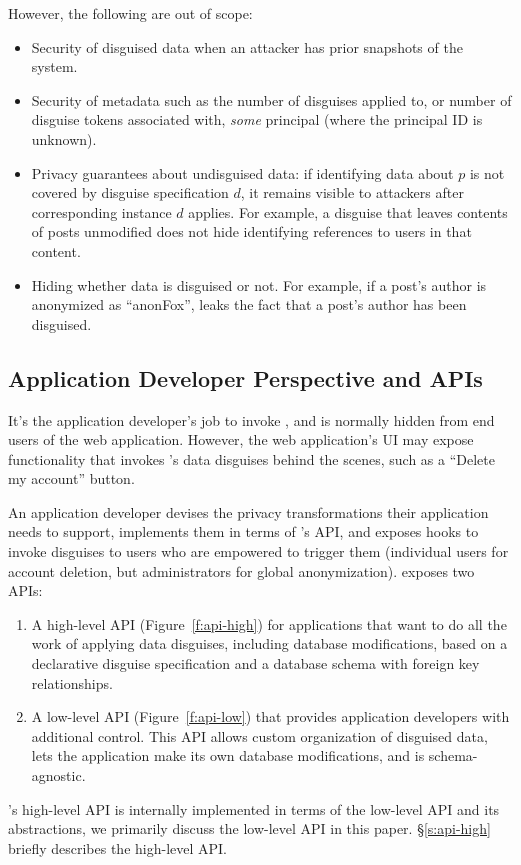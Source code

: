%
However, the following are out of scope:
%
\begin{itemize}[nosep]
    \item Security of disguised data when an attacker has prior snapshots of the system.
    \item Security of metadata such as the number of disguises applied to, or number of
        disguise tokens associated with, \emph{some} principal (where the principal
        ID is unknown).
    \item Privacy guarantees about undisguised data: if identifying data about $p$ is not covered by
        disguise specification $d$, it remains visible to attackers after corresponding instance $d$ applies.
        For example, a disguise that leaves contents of posts unmodified does not hide identifying references
	to users in that content.
    \item Hiding whether data is disguised or not. For example, if a post's author is anonymized as ``anonFox'',
        \sys leaks the fact that a post's author has been disguised.
\end{itemize}



\subsection{Application Developer Perspective and APIs}
%
It's the application developer's job to invoke \sys, and \sys is normally
hidden from end users of the web application.
%
However, the web application's UI may expose functionality that invokes \sys's
data disguises behind the scenes, such as a ``Delete my account'' button.
%

%
An application developer devises the privacy transformations their application needs to
support, implements them in terms of \sys's API, and exposes hooks to invoke disguises to
users who are empowered to trigger them (\eg individual users for account deletion, but
administrators for global anonymization).
%
\sys exposes two APIs:
\begin{enumerate}[nosep]
 \item A high-level API (Figure~\ref{f:api-high}) for applications that want \sys to do
   all the work of applying data disguises, including database modifications, based on
   a declarative disguise specification and a database schema with foreign key
   relationships.
 \item A low-level API (Figure~\ref{f:api-low}) that provides application developers with
   additional control. This API allows custom organization of disguised data, lets the
   application make its own database modifications, and is schema-agnostic.
\end{enumerate}
%
\sys's high-level API is internally implemented in terms of the low-level API and its
abstractions, we primarily discuss the low-level API in this paper.
%
\S\ref{s:api-high} briefly describes the high-level API.
%

